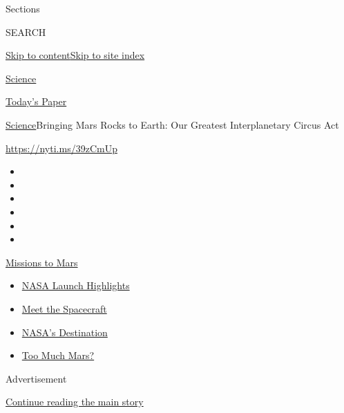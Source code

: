 Sections

SEARCH

\protect\hyperlink{site-content}{Skip to
content}\protect\hyperlink{site-index}{Skip to site index}

\href{https://www.nytimes.com/section/science}{Science}

\href{https://myaccount.nytimes.com/auth/login?response_type=cookie\&client_id=vi}{}

\href{https://www.nytimes.com/section/todayspaper}{Today's Paper}

\href{/section/science}{Science}\textbar{}Bringing Mars Rocks to Earth:
Our Greatest Interplanetary Circus Act

\url{https://nyti.ms/39zCmUp}

\begin{itemize}
\item
\item
\item
\item
\item
\item
\end{itemize}

\href{https://www.nytimes.com/news-event/summer-of-mars?action=click\&pgtype=Article\&state=default\&region=TOP_BANNER\&context=storylines_menu}{Missions
to Mars}

\begin{itemize}
\tightlist
\item
  \href{https://www.nytimes.com/2020/07/30/science/nasa-mars-launch.html?action=click\&pgtype=Article\&state=default\&region=TOP_BANNER\&context=storylines_menu}{NASA
  Launch Highlights}
\item
  \href{https://www.nytimes.com/interactive/2020/science/mars-perseverance-tianwen-hope.html?action=click\&pgtype=Article\&state=default\&region=TOP_BANNER\&context=storylines_menu}{Meet
  the Spacecraft}
\item
  \href{https://www.nytimes.com/2020/07/28/science/nasa-jezero-perseverance.html?action=click\&pgtype=Article\&state=default\&region=TOP_BANNER\&context=storylines_menu}{NASA's
  Destination}
\item
  \href{https://www.nytimes.com/2020/07/28/science/mars-nasa-science.html?action=click\&pgtype=Article\&state=default\&region=TOP_BANNER\&context=storylines_menu}{Too
  Much Mars?}
\end{itemize}

Advertisement

\protect\hyperlink{after-top}{Continue reading the main story}


